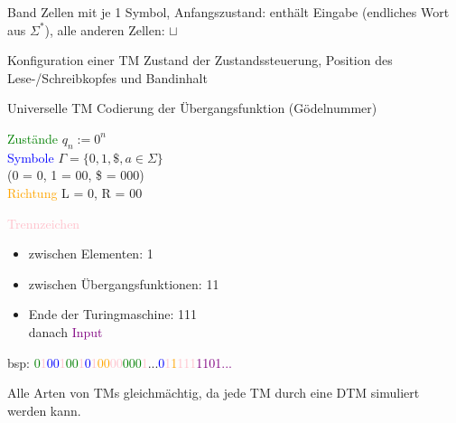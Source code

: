 \begin{definition}{Band} 
    Zellen mit je 1 Symbol, Anfangszustand: enthält Eingabe (endliches Wort aus $\Sigma^{*}$), alle anderen Zellen: $\sqcup$
\end{definition}

\begin{definition}{Konfiguration einer TM}
    Zustand der Zustandssteuerung, Position des Lese-/Schreibkopfes und Bandinhalt
\end{definition}

\begin{example2}{Universelle TM} Codierung der Übergangsfunktion (Gödelnummer)

    \begin{minipage}{0.45\linewidth}
        \textcolor{green}{Zustände} $q_n := 0^n$\\
        \textcolor{blue}{Symbole} $\Gamma = \{0, 1, \$, a \in \Sigma\}$\\ (0 = 0, 1 = 00, \$ = 000)\\
        \textcolor{orange}{Richtung} L = 0, R = 00
    \end{minipage}
    \begin{minipage}{0.55\linewidth}
    \textcolor{pink}{Trennzeichen}
    \begin{itemize}
        \item zwischen Elementen: 1
        \item zwischen Übergangsfunktionen: 11
        \item Ende der Turingmaschine: 111\\ danach \textcolor{purple}{Input}
    \end{itemize}  
    \end{minipage}

    \vspace{1mm}

    bsp: \textcolor{green}{0}\textcolor{pink}{1}\textcolor{blue}{00}\textcolor{pink}{1}\textcolor{green}{00}\textcolor{pink}{1}\textcolor{blue}{0}\textcolor{pink}{1}\textcolor{orange}{00}\textcolor{pink}{00}\textcolor{green}{000}\textcolor{pink}{1}...\textcolor{blue}{0}\textcolor{pink}{1}\textcolor{orange}{1}\textcolor{pink}{111}\textcolor{purple}{1101...}
\end{example2}

\begin{remark}
    Alle Arten von TMs gleichmächtig, da jede TM durch eine DTM simuliert werden kann.
\end{remark}

